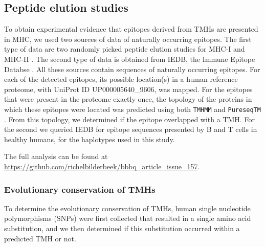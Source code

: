 \subsection{Peptide elution studies}\label{subsec:elution_studies}

To obtain experimental evidence that epitopes derived from TMHs are presented in MHC,
we used two sources of data of naturally occurring epitopes.  
The first type of data are two randomly picked 
peptide elution studies for MHC-I \cite{schellens2015comprehensive} 
and MHC-II \cite{bergseng2015different}.
The second type of data is obtained from IEDB, 
the Immune Epitope Databse \cite{vita2019immune}.
All these sources contain sequences of naturally occurring
epitopes. 
For each of the detected epitopes,
its possible location(s) in 
a human reference proteome,
with UniProt ID UP000005640\_9606, was mapped.
For the epitopes that were present in the proteome exactly once,
the topology of the proteins in which these epitopes were located 
was predicted using both \verb;TMHMM; \cite{krogh2001predicting} 
and \verb;PureseqTM; \cite{wang2019efficient}. 
From this topology, we determined if the epitope
overlapped with a TMH.
For the second we queried IEDB for epitope sequences presented by B and T cells
in healthy humans, for the haplotypes used in this study.

The full analysis can be found
at \url{https://github.com/richelbilderbeek/bbbq_article_issue_157}.

\subsubsection{Evolutionary conservation of TMHs}


To determine the evolutionary conservation of TMHs,
human single nucleotide polymorphisms (SNPs) were first collected
that resulted in a single amino acid substitution,
and we then determined if this substitution occurred within a predicted TMH or not.

